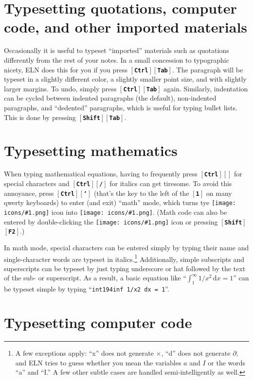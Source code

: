 \documentclass[11pt]{report}
\def\keystroke#1{$\left[\right.\!${\tt\bfseries #1}$\!\left.\right]$}
\def\key#1{\keystroke{#1}}
\def\keycombo#1#2{\keystroke{#1}\keystroke{#2}}
\def\keycontrol#1{\keycombo{Ctrl}{#1}}
\def\keyshift#1{\keycombo{Shift}{#1}}
\def\keyctrlbackslash{\keycontrol{\char92}}
\def\icon#1{\raise-2pt\hbox{\texttt{[image: icons/\#1.png]}}}
\begin{document}
\section{Typesetting quotations, computer code, and other imported materials}

Occasionally it is useful to typeset ``imported'' materials such as
quotations differently from the rest of your notes. In a small
concession to typographic nicety, ELN does this for you if you press
\keycontrol{Tab}.  The paragraph will be typeset in a slightly
different color, a slightly smaller point size, and with slightly
larger margins. To undo, simply press \keycontrol{Tab}
again. Similarly, indentation can be cycled between indented
paragraphs (the default), non-indented paragraphs, and ``dedented''
paragraphs, which is useful for typing bullet lists. This is done by
pressing \keyshift{Tab}.

\section{Typesetting mathematics}

When typing mathematical equations, having to frequently press
\keyctrlbackslash{} for special characters and \keycontrol{/} for
italics can get tiresome. To avoid this annoyance, press
\keycontrol{`} (that's the key to the left of the \key{1} on many
qwerty keyboards) to enter (and exit) ``math'' mode, which turns tye
\icon{type} icon into \icon{type-math}. (Math code can
also be entered by double-clicking the \icon{type} icon
or pressing \keyshift{F2}.)

In math mode, special characters can be entered simply by typing their
name and single-character words are typeset in italics.\footnote{A few
  exceptions apply: ``x'' does not generate $\times$, ``d'' does not
  generate $\partial,$ and ELN tries to guess whether you mean the
  variables $a$ and $I$ or the words ``a'' and ``I.'' A few other
  subtle cases are handled semi-intelligently as well.} Additionally,
simple subscripts and superscripts can be typeset by just typing
underscore or hat followed by the text of the sub- or superscript. As
a result, a basic equation like ``$\int_1^\infty 1/x^2\, \mathrm{d}x =
1$'' can be typeset simple by typing ``{\tt{int1\char94inf
    1/x2 dx = 1}}''.

\section{Typesetting computer code}\label{sec:codemode}
\end{document}
